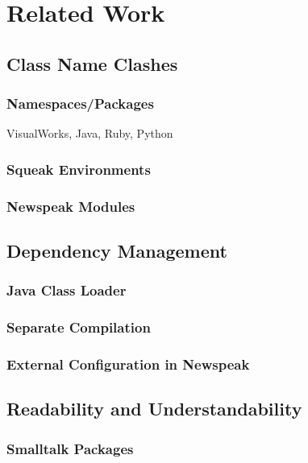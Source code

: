 \chapter{Related Work}

\section{Class Name Clashes}

\subsection{Namespaces/Packages}
VisualWorks, Java, Ruby, Python

\subsection{Squeak Environments}

\subsection{Newspeak Modules}


\section{Dependency Management}

\subsection{Java Class Loader}

\subsection{Separate Compilation}

\subsection{External Configuration in Newspeak}


\section{Readability and Understandability}

\subsection{Smalltalk Packages}


